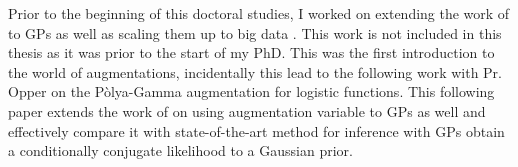 


\graphicspath{{3/figures/}}

Prior to the beginning of this doctoral studies, I worked on extending the work of \citet{henaoBayesianNonlinearSupport2014} to \ac{GPs} as well as scaling them up to big data \cite{wenzel2017bayesian}.
This work is not included in this thesis as it was prior to the start of my PhD.
This was the first introduction to the world of augmentations, incidentally this lead to the following work with Pr. Opper on the P\`olya-Gamma augmentation for logistic functions.
This following paper extends the work of \citet{polsonBayesianInferenceLogistic2012} on using augmentation variable to \ac{GPs} as well and effectively compare it with state-of-the-art method for inference with \ac{GPs} obtain a conditionally conjugate likelihood to a Gaussian prior.





